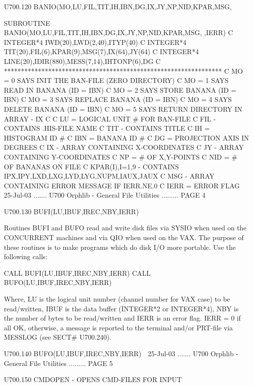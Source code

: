  
 
   U700.120  BANIO(MO,LU,FIL,TIT,IH,IBN,DG,IX,JY,NP,NID,KPAR,MSG,
 
         SUBROUTINE BANIO(MO,LU,FIL,TIT,IH,IBN,DG,IX,JY,NP,NID,KPAR,MSG,
        ,IERR)
   C
         INTEGER*4 IWD(20),LWD(2,40),ITYP(40)
   C
         INTEGER*4 TIT(20),FIL(6),KPAR(9),MSG(7),IX(64),JY(64)
   C
         INTEGER*4 LINE(20),IDIR(880),MESS(7,14),IHTONP(6),DG
   C     ****************************************************************
   C     MO = 0   SAYS INIT THE BAN-FILE (ZERO DIRECTORY)
   C     MO = 1   SAYS READ IN BANANA (ID = IBN)
   C     MO = 2   SAYS STORE   BANANA (ID = IBN)
   C     MO = 3   SAYS REPLACE BANANA (ID = IBN)
   C     MO = 4   SAYS DELETE  BANANA (ID = IBN)
   C     MO = 5   SAYS RETURN  DIRECTORY IN ARRAY - IX
   C
   C     LU   = LOGICAL UNIT # FOR BAN-FILE
   C     FIL  - CONTAINS .HIS-FILE NAME
   C     TIT  - CONTAINS TITLE
   C     IH   = HISTOGRAM ID #
   C     IBN  = BANANA    ID #
   C     DG   = PROJECTION AXIS IN DEGREES
   C     IX   - ARRAY CONTAINING X-COORDINATES
   C     JY   - ARRAY CONTAINING Y-COORDINATES
   C     NP   = # OF X,Y-POINTS
   C     NID  = # OF BANANAS ON FILE
   C     KPAR(I),I=1,9 - CONTAINS IPX,IPY,LXD,LXG,LYD,LYG,NUPM,IAUX,JAUX
   C     MSG  - ARRAY CONTAINING ERROR MESSAGE IF IERR.NE.0
   C     IERR = ERROR FLAG
    
   25-Jul-03 ....... U700  Orphlib - General File Utilities ......... PAGE   4
 
 
   U700.130  BUFI(LU,IBUF,IREC,NBY,IERR)
 
   Routines BUFI and BUFO read and write disk files via  SYSIO  when  used  on
   the  CONCURRENT  machines  and via QIO when used on the VAX. The purpose of
   these routines is to make programs which do disk  I/O  more  portable.  Use
   the following calls:
 
          CALL BUFI(LU,IBUF,IREC,NBY,IERR)
          CALL BUFO(LU,IBUF,IREC,NBY,IERR)
 
   Where,  LU  is  the logical unit number (channel number for VAX case) to be
   read/written, IBUF is the data buffer (INTEGER*2 or INTEGER*4), NBY is  the
   number  of  bytes to be read/written and IERR is an error flag. IERR = 0 if
   all OK, otherwise, a message is reported to the  terminal  and/or  PRT-file
   via MESSLOG (see SECT# U700.240).
 
   U700.140  BUFO(LU,IBUF,IREC,NBY,IERR)
    
   25-Jul-03 ....... U700  Orphlib - General File Utilities ......... PAGE   5
 
 
   U700.150  CMDOPEN  - OPENS CMD-FILES FOR INPUT
 
